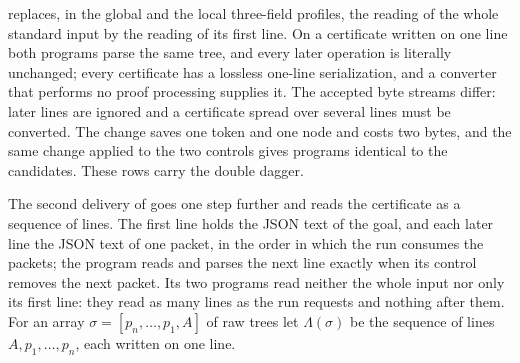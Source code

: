  replaces, in the global and the local three-field
profiles, the reading of the whole standard input by the reading of its first
line. On a certificate written on one line both programs parse the same tree,
and every later operation is literally unchanged; every certificate has a
lossless one-line serialization, and a converter that performs no proof
processing supplies it. The accepted byte streams differ: later lines are
ignored and a certificate spread over several lines must be converted. The
change saves one token and one node and costs two bytes, and the same change
applied to the two controls gives programs identical to the candidates. These
rows carry the double dagger.

The second delivery of  goes one step further and
reads the certificate as a sequence of lines. The first line holds the JSON
text of the goal, and each later line the JSON text of one packet, in the order
in which the run consumes the packets; the program reads and parses the next
line exactly when its control removes the next packet. Its two programs read
neither the whole input nor only its first line: they read as many lines as the
run requests and nothing after them. For an array
$\sigma=[p_n,\dots,p_1,A]$ of raw trees let $\Lambda(\sigma)$ be the sequence of
lines $A,p_1,\dots,p_n$, each written on one line.

